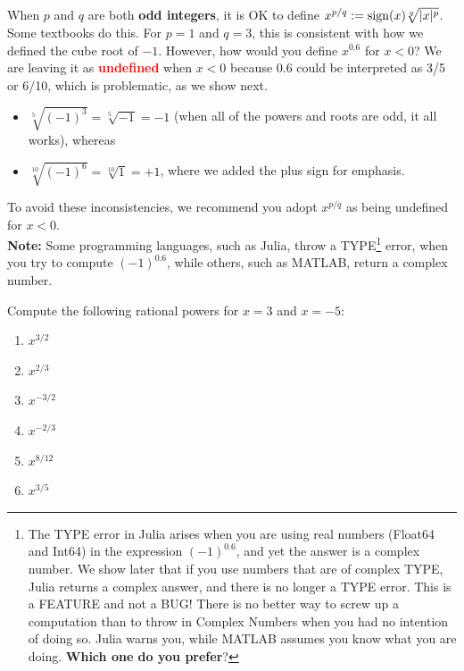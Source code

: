 \begin{rem} When $p$ and $q$ are both \textbf{odd integers}, it is OK to define $x^{p/q} := \mathrm{sign}(x) \sqrt[q]{|x|^p}$. Some textbooks do this. For $p=1$ and $q=3$, this is consistent with how we defined the cube root of $-1$. However, how would you define $x^{0.6}$ for $x<0$? We are leaving it as \textcolor{red}{\bf undefined} when $x <0$ because 0.6 could be interpreted as 3/5 or 6/10, which is problematic, as we show next. 
\begin{itemize}
    \item  $\sqrt[5]{(-1)^3} = \sqrt[5]{-1} = -1$ (when all of the powers and roots are odd, it all works), whereas
    \item  $\sqrt[10]{(-1)^6} = \sqrt[10]{1} = +1$, where we added the plus sign for emphasis. 
\end{itemize}
To avoid these inconsistencies, we recommend you adopt $x^{p/q}$ as being undefined for $x <0$. \\

\textbf{Note:} Some programming languages, such as Julia, throw a TYPE\footnote{The TYPE error in Julia arises when you are using real numbers (Float64 and Int64) in the expression $(-1)^{0.6}$, and yet the answer is a complex number. We show later that if you use numbers that are of complex TYPE, Julia returns a complex answer, and there is no longer a TYPE error. This is a FEATURE and not a BUG! There is no better way to screw up a computation than to throw in Complex Numbers when you had no intention of doing so. Julia warns you, while MATLAB assumes you know what you are doing. \textbf{Which one do you prefer}? } error, when you try to compute $(-1)^{0.6}$, while others, such as MATLAB, return a complex number. \\

\Qed
\end{rem}

\bigskip
\begin{example} Compute the following rational powers for $x=3$ and $x = -5$:
\begin{enumerate}
\renewcommand{\labelenumi}{(\alph{enumi})}
\setlength{\itemsep}{.2cm}
\item $x^{3/2}$
\item $x^{2/3}$
\item $x^{-3/2}$
\item $x^{-2/3}$
\item $x^{8/12}$
\item $x^{3/5}$
\end{enumerate}    
\end{example}

